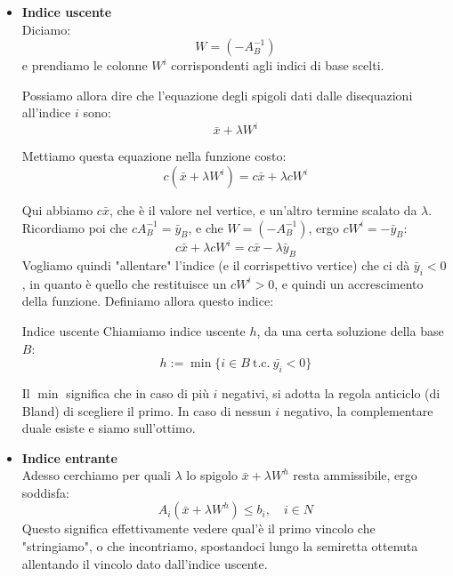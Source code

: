 \documentclass[a4paper,11pt]{article}
\begin{document}
\begin{itemize}
	\item \textbf{\textsf{Indice uscente}} \\
Diciamo:
$$
W = \left( -A_B^{-1} \right)
$$
e prendiamo le colonne $W^i$ corrispondenti agli indici di base scelti.

Possiamo allora dire che l'equazione degli spigoli dati dalle disequazioni all'indice $i$ sono:
$$
\bar{x} + \lambda W^i
$$

Mettiamo questa equazione nella funzione costo:
$$
c\left( \bar{x} + \lambda W^i \right) = c \bar{x} + \lambda c W^{i}
$$

Qui abbiamo $c\bar{x}$, che è il valore nel vertice, e un'altro termine scalato da $\lambda$.
Ricordiamo poi che $cA_B^{-1} = \bar{y}_B$, e che $W = \left( -A_B^{-1} \right)$, ergo $c W^{i} = -\bar{y}_B$:
$$
c \bar{x} + \lambda c W^{i} = c \bar{x} - \lambda \bar{y}_B
$$
Vogliamo quindi "allentare" l'indice (e il corrispettivo vertice) che ci dà $\bar{y}_i < 0$, in quanto è quello che restituisce un $c W^{i} > 0$, e quindi un accrescimento della funzione. 
Definiamo allora questo indice:
\begin{definition}{Indice uscente}
Chiamiamo indice uscente $h$, da una certa soluzione della base $B$:
$$h := \min\{ i \in B \ \text{t.c.} \ \bar{y_i} < 0  \}$$
\end{definition}
Il $\min$ significa che in caso di più $i$ negativi, si adotta la regola anticiclo (di Bland) di scegliere il primo.
In caso di nessun $i$ negativo, la complementare duale esiste e siamo sull'ottimo.

	\item \textbf{\textsf{Indice entrante}} \\
Adesso cerchiamo per quali $\lambda$ lo spigolo $\bar{x} + \lambda W^h$ resta ammissibile, ergo soddisfa:
$$
A_i \left( \bar{x} + \lambda W^h \right) \leq b_i, \quad i \in N 
$$
Questo significa effettivamente vedere qual'è il primo vincolo che "stringiamo", o che incontriamo, spostandoci lungo la semiretta ottenuta allentando il vincolo dato dall'indice uscente.


\end{itemize}
\end{document}
